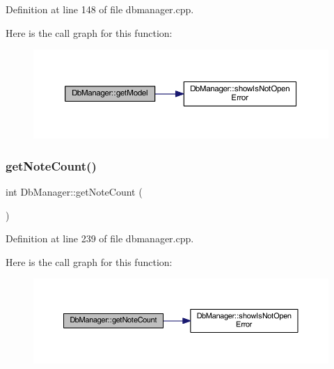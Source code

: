 Definition at line 148 of file dbmanager.\+cpp.

Here is the call graph for this function\+:
\nopagebreak
\begin{figure}[H]
\begin{center}
\leavevmode
\includegraphics[width=350pt]{classDbManager_ac4e759380194e624382e267432de5357_cgraph}
\end{center}
\end{figure}
\hypertarget{classDbManager_ae3998b50545d88a27d4361053f39b050}{}\label{classDbManager_ae3998b50545d88a27d4361053f39b050} 
\subsubsection{\texorpdfstring{get\+Note\+Count()}{getNoteCount()}}
{\footnotesize\ttfamily int Db\+Manager\+::get\+Note\+Count (\begin{DoxyParamCaption}{ }\end{DoxyParamCaption})\hspace{0.3cm}{\ttfamily [static]}}



Definition at line 239 of file dbmanager.\+cpp.

Here is the call graph for this function\+:
\nopagebreak
\begin{figure}[H]
\begin{center}
\leavevmode
\includegraphics[width=350pt]{classDbManager_ae3998b50545d88a27d4361053f39b050_cgraph}
\end{center}
\end{figure}
\hypertarget{classDbManager_a92ebefd0d5fae643db1fc51cc7ea0c31}{}\label{classDbManager_a92ebefd0d5fae643db1fc51cc7ea0c31} 
